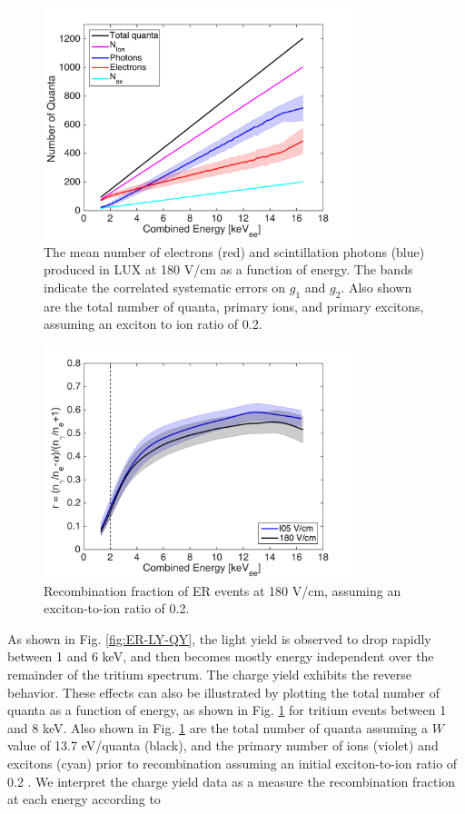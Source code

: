 \begin{figure}[h!]\centering
\includegraphics[width=90mm]{fig/quanta-vs-energy.png}
\caption{The mean number of electrons (red) and scintillation photons (blue) produced in LUX at 180 V/cm as a function of energy. The bands indicate the correlated systematic errors on $g_1$ and $g_2$. Also shown are the total number of quanta, primary ions, and primary excitons, assuming an exciton to ion ratio of 0.2. }
\label{fig:quanta-vs-energy}
\end{figure}


\begin{figure}[h!]\centering
\includegraphics[width=90mm]{fig/recombination.png}
\caption{Recombination fraction of ER events at 180 V/cm, assuming an exciton-to-ion ratio of 0.2.}
\label{fig:recombination}
\end{figure}


As shown in Fig. \ref{fig:ER-LY-QY}, the light yield is observed to drop rapidly between 1 and 6 keV, and then becomes mostly energy independent over the remainder of the tritium spectrum. The charge yield exhibits the reverse behavior. These effects can also be illustrated by plotting the total number of quanta as a function of energy, as shown in Fig. \ref{fig:quanta-vs-energy} for tritium events between 1 and 8 keV. Also shown in Fig. \ref{fig:quanta-vs-energy} are the total number of quanta assuming a $W$ value of 13.7 eV/quanta (black), and the primary number of ions (violet) and excitons (cyan) prior to recombination assuming an initial exciton-to-ion ratio of 0.2 \cite{alpha-value}. We interpret the charge yield data as a measure the recombination fraction at each energy according to

